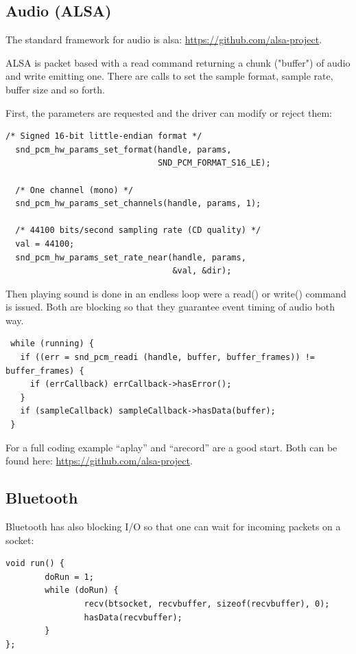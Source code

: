 \documentclass[12pt]{report}
\begin{document}
\subsection{Audio (ALSA)}
The standard framework for audio is alsa: \url{https://github.com/alsa-project}.

ALSA is packet based with a read command
returning a chunk ("buffer") of audio and write emitting one.
There are calls to set the sample format, sample rate, buffer size
and so forth.

First, the parameters are requested and the driver can modify or
reject them:
\begin{verbatim}
/* Signed 16-bit little-endian format */
  snd_pcm_hw_params_set_format(handle, params,
                               SND_PCM_FORMAT_S16_LE);

  /* One channel (mono) */
  snd_pcm_hw_params_set_channels(handle, params, 1);

  /* 44100 bits/second sampling rate (CD quality) */
  val = 44100;
  snd_pcm_hw_params_set_rate_near(handle, params,
                                  &val, &dir);
\end{verbatim}

Then playing sound is done in an endless loop were a read()
or write() command is issued. Both are blocking so that
they guarantee event timing of audio both way.

\begin{verbatim}
 while (running) {
   if ((err = snd_pcm_readi (handle, buffer, buffer_frames)) != buffer_frames) {
     if (errCallback) errCallback->hasError();
   }
   if (sampleCallback) sampleCallback->hasData(buffer);
 }
\end{verbatim}

For a full coding example ``aplay'' and ``arecord'' are a good start.
Both can be found here:
\url{https://github.com/alsa-project}.



\subsection{Bluetooth}

Bluetooth has also blocking I/O so that one can wait for incoming packets on a socket:

\begin{verbatim}
void run() {
        doRun = 1;
        while (doRun) {
                recv(btsocket, recvbuffer, sizeof(recvbuffer), 0);
                hasData(recvbuffer);
        }
};
\end{verbatim}
\end{document}

